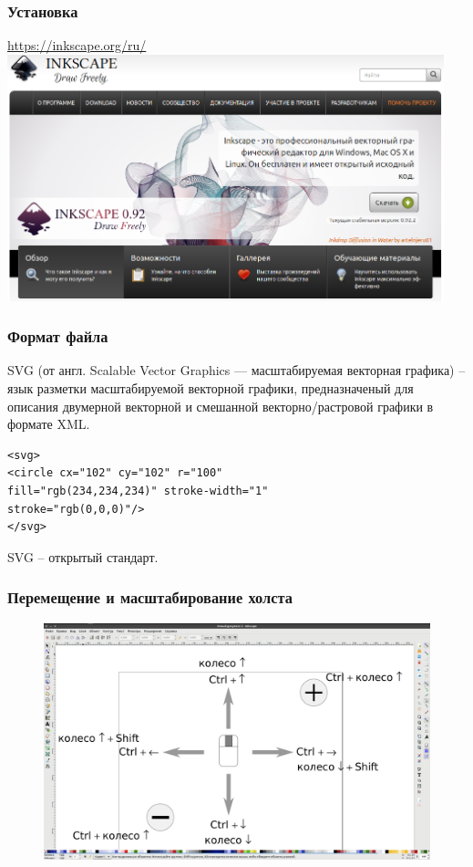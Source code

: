 \documentclass[12pt, compress]{beamer}
\begin{document}
\begin{frame}
\frametitle{Установка}
\url{https://inkscape.org/ru/}
\includegraphics[width=0.95\textwidth]{download.png}
\end{frame}


\begin{frame}[fragile]
\frametitle{Формат файла}
SVG (от англ. Scalable Vector Graphics — масштабируемая векторная графика) -- язык разметки масштабируемой векторной графики, предназначеный для описания двумерной векторной и смешанной векторно/растровой графики в формате XML.
\begin{lstlisting}
<svg>
<circle cx="102" cy="102" r="100" 
fill="rgb(234,234,234)" stroke-width="1" 
stroke="rgb(0,0,0)"/>
</svg>
\end{lstlisting}
SVG -- открытый стандарт.
\end{frame}

\begin{frame}[t]
\frametitle{Перемещение и масштабирование холста}
\begin{figure}[htbp]  
  \includegraphics[width=1.0\textwidth]{pan_zoom.png}  
\end{figure}
\end{frame}
\end{document}
